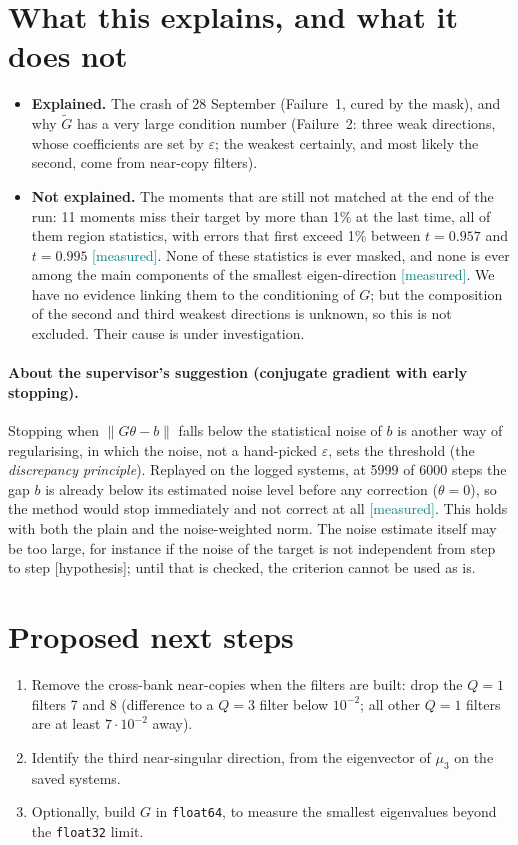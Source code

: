 \documentclass[11pt,a4paper]{article}
\newcommand{\code}[1]{\texttt{#1}}
\newcommand{\meas}{\textcolor{teal}{\textsf{[measured]}}}
\newcommand{\hyp}{\textcolor{orange!80!black}{\textsf{[hypothesis]}}}
\newcommand{\Gt}{\widetilde{G}}
\begin{document}
\section{What this explains, and what it does not}\label{sec:scope}

\begin{itemize}
  \item \textbf{Explained.} The crash of 28 September (Failure~1, cured by the mask), and why $\Gt$ has a
    very large condition number (Failure~2: three weak directions, whose coefficients are set by
    $\varepsilon$; the weakest certainly, and most likely the second, come from near-copy filters).
  \item \textbf{Not explained.} The moments that are still not matched at the end of the run: 11
    moments miss their target by more than 1\% at the last time, all of them region statistics, with errors
    that first exceed 1\% between $t=0.957$ and $t=0.995$ \meas. None of these statistics is ever masked, and
    none is ever among the main components of the smallest eigen-direction \meas. We have no evidence
    linking them to the conditioning of $G$; but the composition of the second and third weakest
    directions is unknown, so this is not excluded. Their cause is under investigation.
\end{itemize}

\paragraph{About the supervisor's suggestion (conjugate gradient with early stopping).} Stopping when
$\|G\theta-b\|$ falls below the statistical noise of $b$ is another way of regularising, in which the noise,
not a hand-picked $\varepsilon$, sets the threshold (the \emph{discrepancy principle}). Replayed on the
logged systems, at 5999 of 6000 steps the gap $b$ is already below its estimated noise level before any
correction ($\theta=0$), so the method would stop immediately and not correct at all \meas. This holds with both the plain and the
noise-weighted norm. The noise estimate itself may be too large, for instance if the noise of the target is
not independent from step to step \hyp; until that is checked, the criterion cannot be used as is.

\section*{Proposed next steps}
\begin{enumerate}
  \item Remove the cross-bank near-copies when the filters are built: drop the $Q=1$ filters 7 and 8
    (difference to a $Q=3$ filter below $10^{-2}$; all other $Q=1$ filters are at least $7\cdot10^{-2}$ away).
  \item Identify the third near-singular direction, from the eigenvector of $\mu_3$ on the saved systems.
  \item Optionally, build $G$ in \code{float64}, to measure the smallest eigenvalues beyond the
    \code{float32} limit.
\end{enumerate}
\end{document}
